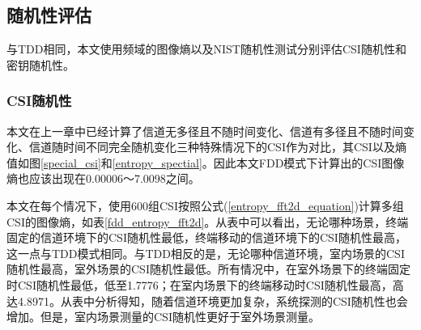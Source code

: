 \documentclass[master]{seuthesis} %
\begin{document}
\begin{Main}
\begin{table}[]
    \centering
    \caption{室内、走廊和室外三种场景的平均安全信息率
    \label{fdd_three_scene_avg}}
\end{table}

\begin{table}[]
    \centering
    \caption{终端固定、人员走动和终端移动三种信道环境的平均安全信息率
    \label{fdd_three_channel_env_avg}}
\end{table}

\subsection{随机性评估}

与TDD相同，本文使用频域的图像熵以及NIST随机性测试分别评估CSI随机性和密钥随机性。

\subsubsection{CSI随机性}

本文在上一章中已经计算了信道无多径且不随时间变化、信道有多径且不随时间变化、信道随时间不同完全随机变化三种特殊情况下的CSI作为对比，其CSI以及熵值如图\ref{special_csi}和\ref{entropy_spectial}。因此本文FDD模式下计算出的CSI图像熵也应该出现在0.00006～7.0098之间。

本文在每个情况下，使用600组CSI按照公式(\ref{entropy_fft2d_equation})计算多组CSI的图像熵，如表\ref{fdd_entropy_fft2d}。从表中可以看出，无论哪种场景，终端固定的信道环境下的CSI随机性最低，终端移动的信道环境下的CSI随机性最高，这一点与TDD模式相同。与TDD相反的是，无论哪种信道环境，室内场景的CSI随机性最高，室外场景的CSI随机性最低。所有情况中，在室外场景下的终端固定时CSI随机性最低，低至1.7776；在室内场景下的终端移动时CSI随机性最高，高达4.8971。从表中分析得知，随着信道环境更加复杂，系统探测的CSI随机性也会增加。但是，室内场景测量的CSI随机性更好于室外场景测量。


\end{Main}
\end{document}
